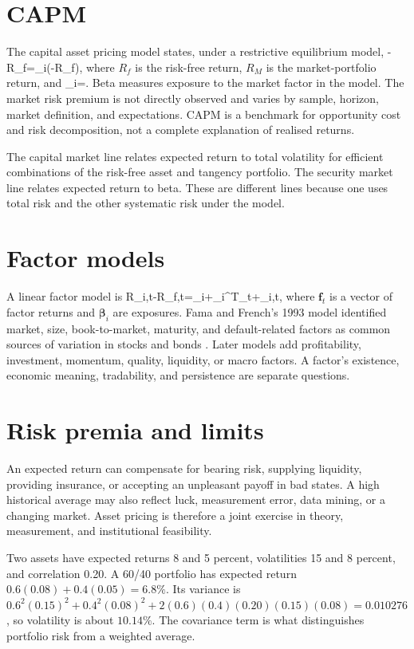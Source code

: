 \section{CAPM}
The capital asset pricing model states, under a restrictive equilibrium model,
  \E[R_i]-R_f=\beta_i\left(\E[R_M]-R_f\right),
\closeformula
where $R_f$ is the risk-free return, $R_M$ is the market-portfolio return, and
  \beta_i=.
\closeformula
Beta measures exposure to the market factor in the model. The market risk premium is not directly observed and varies by sample, horizon, market definition, and expectations. CAPM is a benchmark for opportunity cost and risk decomposition, not a complete explanation of realised returns.

The capital market line relates expected return to total volatility for efficient combinations of the risk-free asset and tangency portfolio. The security market line relates expected return to beta. These are different lines because one uses total risk and the other systematic risk under the model.

\section{Factor models}
A linear factor model is
  R_{i,t}-R_{f,t}=\alpha_i+\boldsymbol\beta_i^{\mathsf T}_t+\varepsilon_{i,t},
\closeformula
where $\mathbf{f}_t$ is a vector of factor returns and $\boldsymbol\beta_i$ are exposures. Fama and French's 1993 model identified market, size, book-to-market, maturity, and default-related factors as common sources of variation in stocks and bonds \cite{famafrench1993}. Later models add profitability, investment, momentum, quality, liquidity, or macro factors. A factor's existence, economic meaning, tradability, and persistence are separate questions.

\section{Risk premia and limits}
An expected return can compensate for bearing risk, supplying liquidity, providing insurance, or accepting an unpleasant payoff in bad states. A high historical average may also reflect luck, measurement error, data mining, or a changing market. Asset pricing is therefore a joint exercise in theory, measurement, and institutional feasibility.

\begin{worked}
Two assets have expected returns 8 and 5 percent, volatilities 15 and 8 percent, and correlation 0.20. A 60/40 portfolio has expected return $0.6(0.08)+0.4(0.05)=6.8\%$. Its variance is $0.6^2(0.15)^2+0.4^2(0.08)^2+2(0.6)(0.4)(0.20)(0.15)(0.08)=0.010276$, so volatility is about $10.14\%$. The covariance term is what distinguishes portfolio risk from a weighted average.
\end{worked}

